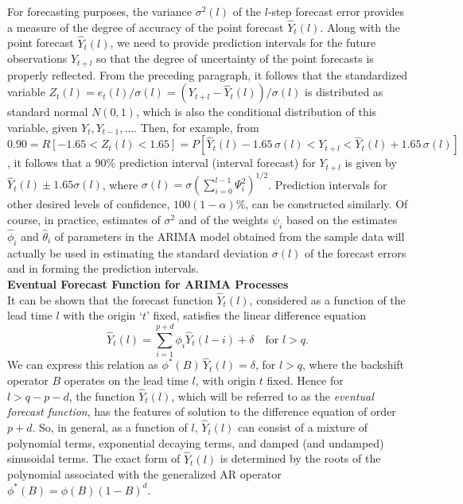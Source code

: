 For forecasting purposes, the variance $\sigma^2(l)$ of the $l$-step forecast error provides a measure of the degree of accuracy of the point forecast $\hat{Y}_t(l)$. Along with the point forecast $\hat{Y}_t(l)$, we need to provide prediction intervals for the future observations $Y_{t+l}$ so that the degree of uncertainty of the point forecasts is properly reflected. From the preceding paragraph, it follows that the standardized variable $Z_t(l) = e_t(l) / \sigma(l)= ( Y_{t+l} - \hat{Y}_t(l) ) / \sigma(l)$ is distributed as standard normal $N(0,1)$, which is also the conditional distribution of this variable, given $Y_t, Y_{t-1}, \ldots$. Then, for example, from $0.90 = R[-1.65 < Z_t(l) < 1.65] = P[\hat{Y}_t(l) - 1.65\,\sigma(l) < Y_{t+l} < \hat{Y}_t(l) + 1.65\,\sigma(l)]$, it follows that a $90\%$ prediction interval (interval forecast) for $Y_{t+l}$ is given by $\hat{Y}_t(l) \pm 1.65 \sigma(l)$, where $\sigma(l) = \sigma( \sum_{i=0}^{l-1} \Psi_i^2 )^{1/2}$. Prediction intervals for other desired levels of confidence, $100(1 - \alpha)\%$, can be constructed similarly. Of course, in practice, estimates of $\sigma^2$ and of the weights $\psi_i$ based on the estimates $\hat{\phi}_i$ and $\hat{\theta}_i$ of parameters in the ARIMA model obtained from the sample data will actually be used in estimating the standard deviation $\sigma(l)$ of the forecast errors and in forming the prediction intervals. \\


\noindent\textbf{Eventual Forecast Function for ARIMA Processes} \\


It can be shown that the forecast function $\hat{Y}_t(l)$, considered as a function of the lead time $l$ with the origin `$t$' fixed, satisfies the linear difference equation
	\begin{equation} \label{eqn:2twoyhat}
	\hat{Y}_t(l) = \sum_{i=1}^{p+d}  \phi_i \hat{Y}_t(l-i) + \delta \quad \text{for } l > q.
	\end{equation}
We can express this relation as $\phi^*(B)\, \hat{Y}_t(l) = \delta$, for $l > q$, where the backshift operator $B$ operates on the lead time $l$, with origin $t$ fixed. Hence for $l > q - p - d$, the function $\hat{Y}_t(l)$, which will be referred to as the \emph{eventual forecast function}, has the features of solution to the difference equation of order $p + d$. So, in general, as a function of $l$, $\hat{Y}_t(l)$ can consist of a mixture of polynomial terms, exponential decaying terms, and damped (and undamped) sinusoidal terms. The exact form of $\hat{Y}_t(l)$ is determined by the roots of the polynomial associated with the generalized AR operator $\phi^*(B) = \phi(B)(1 - B)^d$. 


